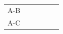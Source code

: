 {\begin{tabular}[t]{|l|l|l|l|l|l|}
        A-B &
         &
         &
         &
         &
     \tabularnewline\cline{1-1}\cline{2-2}\cline{3-3}\cline{4-4}\cline{5-5}\cline{6-6}
        A-C &
         &
         &
         &
         &
     \tabularnewline\cline{1-1}\cline{2-2}\cline{3-3}\cline{4-4}\cline{5-5}\cline{6-6}

\end{tabular}}
